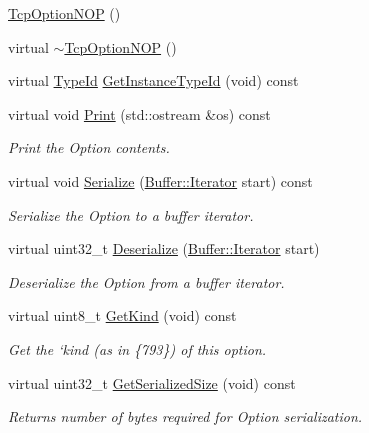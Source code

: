\begin{DoxyCompactItemize}
\item 
\hyperlink{classns3_1_1TcpOptionNOP_a74aa0c308c7b32efffef9c737a9db2d5}{Tcp\+Option\+N\+OP} ()
\item 
virtual \hyperlink{classns3_1_1TcpOptionNOP_af3c64590acbe5c3b235bd0974519ea0d}{$\sim$\+Tcp\+Option\+N\+OP} ()
\item 
virtual \hyperlink{classns3_1_1TypeId}{Type\+Id} \hyperlink{classns3_1_1TcpOptionNOP_ac8a04ec590e6a9dc77ce2002fa362df5}{Get\+Instance\+Type\+Id} (void) const 
\item 
virtual void \hyperlink{classns3_1_1TcpOptionNOP_ac59416ccd5fed52b5df605eeee3ee532}{Print} (std\+::ostream \&os) const 
\begin{DoxyCompactList}\small\item\em Print the Option contents. \end{DoxyCompactList}\item 
virtual void \hyperlink{classns3_1_1TcpOptionNOP_a64ddd8ac034f39f32239e2a93863037d}{Serialize} (\hyperlink{classns3_1_1Buffer_1_1Iterator}{Buffer\+::\+Iterator} start) const 
\begin{DoxyCompactList}\small\item\em Serialize the Option to a buffer iterator. \end{DoxyCompactList}\item 
virtual uint32\+\_\+t \hyperlink{classns3_1_1TcpOptionNOP_acaf185cfcb6112d20a4069ba52068c31}{Deserialize} (\hyperlink{classns3_1_1Buffer_1_1Iterator}{Buffer\+::\+Iterator} start)
\begin{DoxyCompactList}\small\item\em Deserialize the Option from a buffer iterator. \end{DoxyCompactList}\item 
virtual uint8\+\_\+t \hyperlink{classns3_1_1TcpOptionNOP_a40ef2a6a48db1f4eb0b4d02a30d78312}{Get\+Kind} (void) const 
\begin{DoxyCompactList}\small\item\em Get the `kind\textquotesingle{} (as in \{793\}) of this option. \end{DoxyCompactList}\item 
virtual uint32\+\_\+t \hyperlink{classns3_1_1TcpOptionNOP_a41871ec3eab3716db95de220e6dc6dfd}{Get\+Serialized\+Size} (void) const 
\begin{DoxyCompactList}\small\item\em Returns number of bytes required for Option serialization. \end{DoxyCompactList}\end{DoxyCompactItemize}
